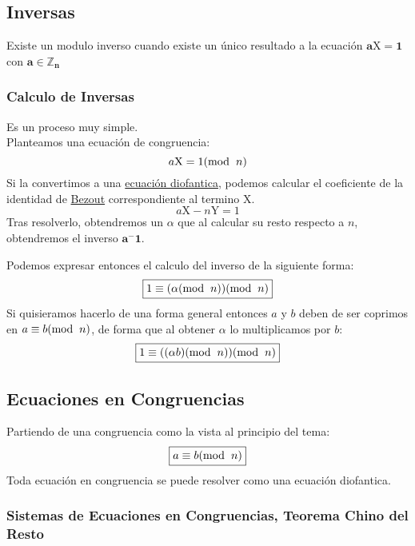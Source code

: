 \subsection{Inversas}
\noindent Existe un modulo inverso cuando existe un único resultado a la ecuación \(\boxed{\mathbf{{a\mathrm{X} = 1}}}\) con \(\mathbf{a \in \mathbb{Z}_n}\)
\subsubsection{Calculo de Inversas}
\noindent Es un proceso muy simple.\\ Planteamos una ecuación de congruencia:
\[
        a\mathrm{X} = 1 (\textnormal{mod}\hspace{2mm}n)
\]
\noindent Si la convertimos a una \underline{ecuación diofantica}, podemos calcular el coeficiente de la identidad de \underline{Bezout} correspondiente al termino \(\mathrm{X}\).
\[
        a\mathrm{X} - n\mathrm{Y} = 1
\]
Tras resolverlo, obtendremos un \(\alpha\) que al calcular su resto respecto a \(n\), obtendremos el inverso \(\mathbf{a^-1}\).\par
\noindent Podemos expresar entonces el calculo del inverso de la siguiente forma:
\[
        \boxed{1 \equiv (\alpha (\textnormal{mod}\hspace{2mm}n))(\textnormal{mod}\hspace{2mm}n)}
\]
\noindent Si quisieramos hacerlo de una forma general entonces \(a\) y \(b\) deben de ser coprimos en \(a \equiv b(\textnormal{mod}\hspace{2mm}n)\), de forma que al obtener \(\alpha\) lo multiplicamos por \(b\):
\[
        \boxed{1 \equiv ((\alpha b) (\textnormal{mod}\hspace{2mm}n))(\textnormal{mod}\hspace{2mm}n)}
\]
\subsection{Ecuaciones en Congruencias}
\noindent Partiendo de una congruencia como la vista al principio del tema:
\[
        \boxed{a \equiv b(\textnormal{mod}\hspace{2mm}n)}
\]
\noindent Toda ecuación en congruencia se puede resolver como una ecuación diofantica.
\subsubsection{Sistemas de Ecuaciones en Congruencias, Teorema Chino del Resto}
